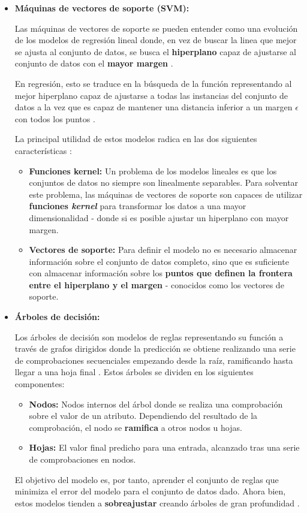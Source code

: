 \begin{itemize}[leftmargin=*]
	\item \textbf{Máquinas de vectores de soporte (SVM):} 
	
	Las máquinas de vectores de soporte se pueden entender como una evolución de los modelos de regresión lineal donde, en vez de buscar la linea que mejor se ajusta al conjunto de datos, se busca el \textbf{hiperplano} capaz de ajustarse al conjunto de datos con el \textbf{mayor margen} \cite{aima}. 
	
	En regresión, esto se traduce en la búsqueda de la función representando al mejor hiperplano capaz de ajustarse a todas las instancias del conjunto de datos a la vez que es capaz de mantener una distancia inferior a un margen $\epsilon$ con todos los puntos \cite{svr}.
	
	La principal utilidad de estos modelos radica en las dos siguientes características \cite{aima}:
	\begin{itemize}
		\item \textbf{Funciones kernel:} Un problema de los modelos lineales es que los conjuntos de datos no siempre son linealmente separables. Para solventar este problema, las máquinas de vectores de soporte son capaces de utilizar \textbf{funciones \textit{kernel}} para transformar los datos a una mayor dimensionalidad - donde si es posible ajustar un hiperplano con mayor margen.
		\item \textbf{Vectores de soporte:} Para definir el modelo no es necesario almacenar información sobre el conjunto de datos completo, sino que es suficiente con almacenar información sobre los \textbf{puntos que definen la frontera entre el hiperplano y el margen} - conocidos como los vectores de soporte.
	\end{itemize}
	
	\item \textbf{Árboles de decisión:} 
	
	Los árboles de decisión son modelos de reglas representando su función a través de grafos dirigidos \cite{Burkov2019TheHM} donde la predicción se obtiene realizando una serie de comprobaciones secuenciales empezando desde la raíz, ramificando hasta llegar a una hoja final \cite{aima}. Estos árboles se dividen en los siguientes componentes:
	
	\begin{itemize}
		\item \textbf{Nodos:} Nodos internos del árbol donde se realiza una comprobación sobre el valor de un atributo. Dependiendo del resultado de la comprobación, el nodo se \textbf{ramifica} a otros nodos u hojas.
		\item \textbf{Hojas:} El valor final predicho para una entrada, alcanzado tras una serie de comprobaciones en nodos.
	\end{itemize}
	
	El objetivo del modelo es, por tanto, aprender el conjunto de reglas que minimiza el error del modelo para el conjunto de datos dado. Ahora bien, estos modelos tienden a \textbf{sobreajustar} creando árboles de gran profundidad \cite{aima}.

\end{itemize}

